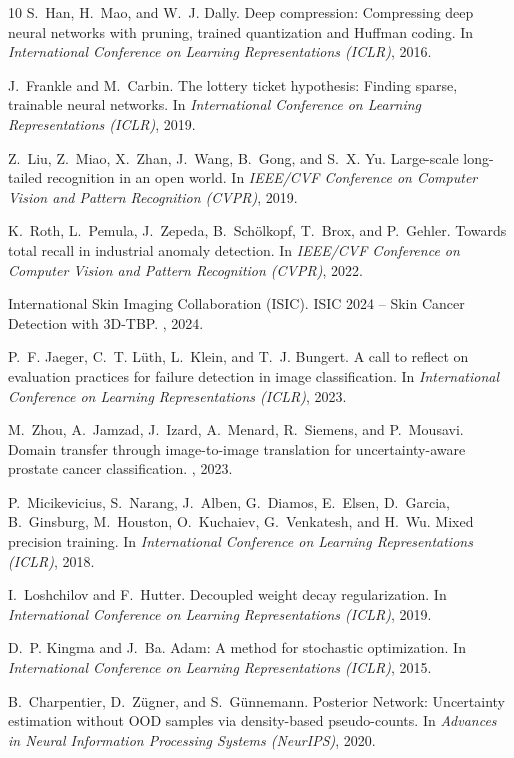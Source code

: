 \documentclass[letterpaper]{article} %
\begin{document}
\begin{thebibliography}{10}
S.~Han, H.~Mao, and W.~J. Dally.
\newblock Deep compression: Compressing deep neural networks with pruning, trained quantization and Huffman coding.
\newblock In {\em International Conference on Learning Representations (ICLR)}, 2016.

J.~Frankle and M.~Carbin.
\newblock The lottery ticket hypothesis: Finding sparse, trainable neural networks.
\newblock In {\em International Conference on Learning Representations (ICLR)}, 2019.

Z.~Liu, Z.~Miao, X.~Zhan, J.~Wang, B.~Gong, and S.~X. Yu.
\newblock Large-scale long-tailed recognition in an open world.
\newblock In {\em IEEE/CVF Conference on Computer Vision and Pattern Recognition (CVPR)}, 2019.

K.~Roth, L.~Pemula, J.~Zepeda, B.~Sch{\"o}lkopf, T.~Brox, and P.~Gehler.
\newblock Towards total recall in industrial anomaly detection.
\newblock In {\em IEEE/CVF Conference on Computer Vision and Pattern Recognition (CVPR)}, 2022.

International Skin Imaging Collaboration (ISIC).
\newblock ISIC 2024 -- Skin Cancer Detection with 3D-TBP.
, 2024.

P.~F. Jaeger, C.~T. L{\"u}th, L.~Klein, and T.~J. Bungert.
\newblock A call to reflect on evaluation practices for failure detection in image classification.
\newblock In {\em International Conference on Learning Representations (ICLR)}, 2023.

M.~Zhou, A.~Jamzad, J.~Izard, A.~Menard, R.~Siemens, and P.~Mousavi.
\newblock Domain transfer through image-to-image translation for uncertainty-aware prostate cancer classification.
, 2023.

P.~Micikevicius, S.~Narang, J.~Alben, G.~Diamos, E.~Elsen, D.~Garcia, B.~Ginsburg, M.~Houston, O.~Kuchaiev, G.~Venkatesh, and H.~Wu.
\newblock Mixed precision training.
\newblock In {\em International Conference on Learning Representations (ICLR)}, 2018.

I.~Loshchilov and F.~Hutter.
\newblock Decoupled weight decay regularization.
\newblock In {\em International Conference on Learning Representations (ICLR)}, 2019.

D.~P. Kingma and J.~Ba.
\newblock Adam: A method for stochastic optimization.
\newblock In {\em International Conference on Learning Representations (ICLR)}, 2015.

B.~Charpentier, D.~Z{\"u}gner, and S.~G{\"u}nnemann.
\newblock Posterior Network: Uncertainty estimation without OOD samples via density-based pseudo-counts.
\newblock In {\em Advances in Neural Information Processing Systems (NeurIPS)}, 2020.

\end{thebibliography}
\end{document}
